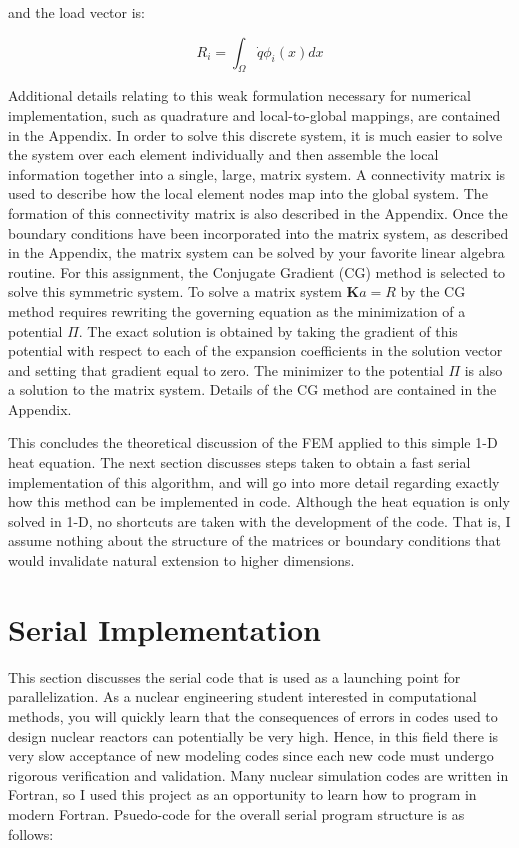 \documentclass[10pt]{article}
\newcommand{\beq}{\begin{equation}}
\newcommand{\eeq}{\end{equation}}
\begin{document}
and the load vector is:

\beq
R_{i}=\int_{\Omega}\dot{q}\phi_i(x)dx
\eeq

Additional details relating to this weak formulation necessary for numerical implementation, such as quadrature and local-to-global mappings, are contained in the Appendix. In order to solve this discrete system, it is much easier to solve the system over each element individually and then assemble the local information together into a single, large, matrix system. A connectivity matrix is used to describe how the local element nodes map into the global system. The formation of this connectivity matrix is also described in the Appendix. Once the boundary conditions have been incorporated into the matrix system, as described in the Appendix, the matrix system can be solved by your favorite linear algebra routine. For this assignment, the Conjugate Gradient (CG) method is selected to solve this symmetric system. To solve a matrix system \(\textbf{K}a=R\) by the CG method requires rewriting the governing equation as the minimization of a potential \(\Pi\). The exact solution is obtained by taking the gradient of this potential with respect to each of the expansion coefficients in the solution vector and setting that gradient equal to zero. The minimizer to the potential \(\Pi\) is also a solution to the matrix system. Details of the CG method are contained in the Appendix.

This concludes the theoretical discussion of the FEM applied to this simple 1-D heat equation. The next section discusses steps taken to obtain a fast serial implementation of this algorithm, and will go into more detail regarding exactly how this method can be implemented in code. Although the heat equation is only solved in 1-D, no shortcuts are taken with the development of the code. That is, I assume nothing about the structure of the matrices or boundary conditions that would invalidate natural extension to higher dimensions.

\section{Serial Implementation}

This section discusses the serial code that is used as a launching point for parallelization. As a nuclear engineering student interested in computational methods, you will quickly learn that the consequences of errors in codes used to design nuclear reactors can potentially be very high. Hence, in this field there is very slow acceptance of new modeling codes since each new code must undergo rigorous verification and validation. Many nuclear simulation codes are written in Fortran, so I used this project as an opportunity to learn how to program in modern Fortran. Psuedo-code for the overall serial program structure is as follows:
\end{document}
